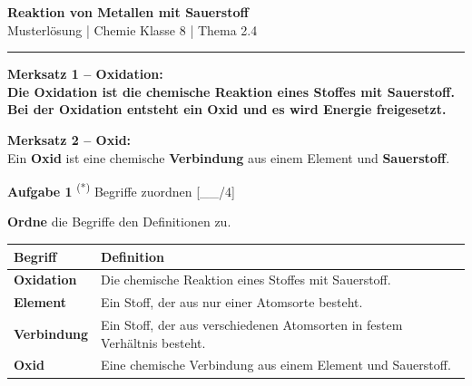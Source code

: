 \documentclass[11pt, a4paper]{article}
\newcommand{\fach}{Chemie}
\newcommand{\thema}{Reaktion von Metallen mit Sauerstoff}
\newcommand{\klasse}{8}
\newif\ifzeigesternchen\zeigesternchentrue
\newcommand{\lsg}[1]{\textcolor{loesung}{\textbf{#1}}}  %
\newcommand{\punktebox}[1]{\hfill\small\textcolor{mittelgrau}{[\_\_/#1]}}
\newcommand{\stern}[1]{%
    \ifzeigesternchen%
        \textsuperscript{\textcolor{fachfarbe}{(#1)}}%
    \fi%
}
\newcommand{\aufgabe}[2]{%
    \needspace{4\baselineskip}%
    \vspace{10pt}%
    \noindent\textbf{\textcolor{fachfarbe}{Aufgabe #1}} #2%
    \vspace{4pt}%
    \nopagebreak[4]%
}
\newcommand{\operator}[1]{\textbf{\textcolor{fachfarbe}{#1}}}
\begin{document}

\begin{center}
    {\Large\bfseries\textcolor{fachfarbe}{\thema}}\\[0.2em]
    {\small Musterlösung | \fach{} Klasse \klasse{} | Thema 2.4}
\end{center}
\vspace{-0.3em}
\hrule
\vspace{0.6em}


\begin{merkkasten}
\textbf{Merksatz 1 – Oxidation:}\\[0.3em]
\lsg{Die Oxidation ist die chemische Reaktion eines Stoffes mit Sauerstoff.}\\[0.3em]
\lsg{Bei der Oxidation entsteht ein Oxid und es wird Energie freigesetzt.}

\vspace{0.8em}

\textbf{Merksatz 2 – Oxid:}\\[0.3em]
Ein \lsg{Oxid} ist eine chemische \lsg{Verbindung} aus einem Element und \lsg{Sauerstoff}.
\end{merkkasten}


\aufgabe{1}{\stern{*} Begriffe zuordnen} \punktebox{4}

\operator{Ordne} die Begriffe den Definitionen zu.

\begin{center}
\begin{tabular}{|p{3cm}|p{10cm}|}
\hline
\textbf{Begriff} & \textbf{Definition} \\
\hline
\lsg{Oxidation} & Die chemische Reaktion eines Stoffes mit Sauerstoff. \\
\hline
\lsg{Element} & Ein Stoff, der aus nur einer Atomsorte besteht. \\
\hline
\lsg{Verbindung} & Ein Stoff, der aus verschiedenen Atomsorten in festem Verhältnis besteht. \\
\hline
\lsg{Oxid} & Eine chemische Verbindung aus einem Element und Sauerstoff. \\
\hline
\end{tabular}
\end{center}
\end{document}
